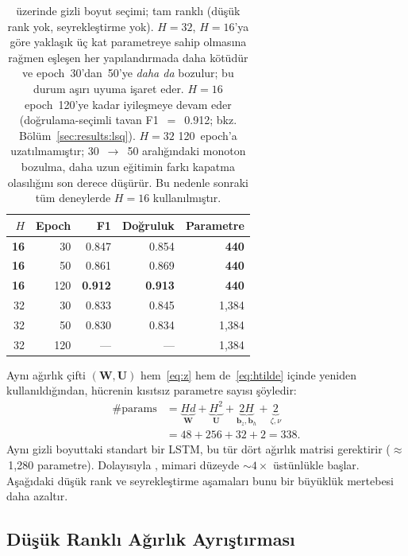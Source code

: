 \begin{table}[h]
\centering
\caption{\hapt{} üzerinde gizli boyut seçimi; tam ranklı
\fastgrnn{} (düşük rank yok, seyrekleştirme yok). $H{=}32$,
$H{=}16$'ya göre yaklaşık üç kat parametreye sahip olmasına rağmen
eşleşen her yapılandırmada daha kötüdür ve epoch~30'dan~50'ye
\emph{daha da} bozulur; bu durum aşırı uyuma işaret eder.
$H{=}16$ epoch~120'ye kadar iyileşmeye devam eder
(doğrulama-seçimli tavan F1~$=$~0.912; bkz.
Bölüm~\ref{sec:results:lsq}). $H{=}32$ 120~epoch'a
uzatılmamıştır; 30~$\rightarrow$~50 aralığındaki monoton bozulma,
daha uzun eğitimin farkı kapatma olasılığını son derece düşürür.
Bu nedenle sonraki tüm deneylerde $H{=}16$ kullanılmıştır.}
\label{tab:hsize}
\begin{tabular}{rrrrr}
\toprule
$H$ & Epoch & F1 & Doğruluk & Parametre \\
\midrule
\textbf{16} & 30  & 0.847          & 0.854          & \textbf{440}   \\
\textbf{16} & 50  & 0.861          & 0.869          & \textbf{440}   \\
\textbf{16} & 120 & \textbf{0.912} & \textbf{0.913} & \textbf{440}   \\
32          & 30  & 0.833          & 0.845          & 1{,}384         \\
32          & 50  & 0.830          & 0.834          & 1{,}384         \\
32          & 120 & ---            & ---            & 1{,}384         \\
\bottomrule
\end{tabular}
\end{table}

Aynı ağırlık çifti $(\mathbf{W}, \mathbf{U})$ hem~\eqref{eq:z}
hem de~\eqref{eq:htilde} içinde yeniden kullanıldığından, hücrenin
kısıtsız parametre sayısı şöyledir:
\begin{align}
\#\text{params}
 &= \underbrace{Hd}_{\mathbf{W}} +
    \underbrace{H^2}_{\mathbf{U}} +
    \underbrace{2H}_{\mathbf{b}_z,\mathbf{b}_h} +
    \underbrace{2}_{\zeta,\nu} \nonumber\\
 &= 48 + 256 + 32 + 2 = 338.
\end{align}
Aynı gizli boyuttaki standart bir LSTM, bu tür dört ağırlık matrisi
gerektirir ($\approx$\,1{,}280 parametre). Dolayısıyla
\fastgrnn{}, mimari düzeyde $\sim$$4\times$ üstünlükle başlar.
Aşağıdaki düşük rank ve seyrekleştirme aşamaları bunu bir büyüklük
mertebesi daha azaltır.

\subsection{Düşük Ranklı Ağırlık Ayrıştırması}
\label{sec:method:lowrank}

